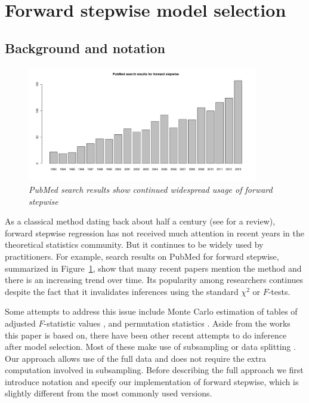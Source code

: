 \documentclass{imsart}
\begin{document}

\section{Forward stepwise model selection}
\label{sec:stepwise}

\subsection{Background and notation}

\begin{figure}
\begin{center}
\includegraphics[width=0.9\textwidth]{../figs/pubmed.pdf}
\caption{\small \em PubMed search results show continued widespread usage of forward stepwise}
\label{fig:pubmed}
\end{center}
\end{figure}

As a classical method dating back about half a century
(see \cite{classical:selection} for a review),
forward stepwise regression has not received much attention in
recent years in the theoretical statistics community. But it continues
to be widely used by practitioners.
For example, search results on PubMed for forward stepwise,
summarized in Figure~\ref{fig:pubmed}, show that many recent
papers mention the method and there is an increasing trend over time.
Its popularity among researchers continues despite the fact that it
invalidates inferences using the standard $\chi^2$ or $F$-tests.


Some attempts to address this issue include Monte Carlo
estimation of tables of adjusted $F$-statistic values \citep{mc:ftoenter},
and permutation statistics \citep{permutation:stop}. Aside from the works
this paper is based on, there have been other recent attempts to do
inference after model selection. Most of these make use of subsampling
\citep{meinshausen:buhlmann} or data splitting \citep{wasserman:roeder}.
Our approach allows use of the full data and does not require the
extra computation involved in subsampling.
Before describing the full approach we first introduce notation and
specify our implementation of forward stepwise, which is slightly
different from the most commonly used versions.
\end{document}
